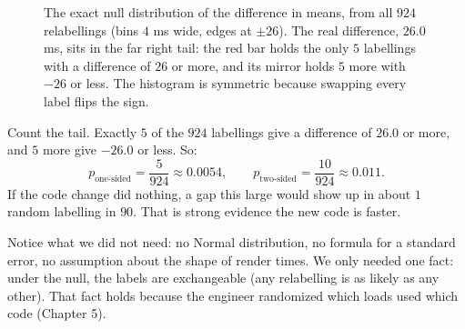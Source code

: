 \begin{figure}[H]
\centering
{}
\caption{The exact null distribution of the difference in means, from all $924$
relabellings (bins $4$ ms wide, edges at $\pm 26$). The real difference, $26.0$ ms,
sits in the far right tail: the red bar holds the only $5$ labellings with a
difference of $26$ or more, and its mirror holds $5$ more with $-26$ or less.
The histogram is symmetric because swapping every label flips the sign.}
\label{fig:ht-perm-null}
\end{figure}

Count the tail. Exactly $5$ of the $924$ labellings give a difference of $26.0$ or
more, and $5$ more give $-26.0$ or less. So:
\[
  p_{\text{one-sided}} = \frac{5}{924} \approx 0.0054,
  \qquad
  p_{\text{two-sided}} = \frac{10}{924} \approx 0.011 .
\]
If the code change did nothing, a gap this large would show up in about $1$ random
labelling in $90$. That is strong evidence the new code is faster.

Notice what we did not need: no Normal distribution, no formula for a standard
error, no assumption about the shape of render times. We only needed one fact: under
the null, the labels are exchangeable (any relabelling is as likely as any other).
That fact holds because the engineer randomized which loads used which code
(Chapter 5).

